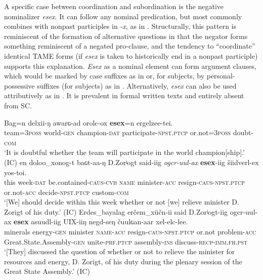 \documentclass[output=paper,colorlinks,citecolor=brown,chinesefont]{langscibook}
\begin{document}
A specific case between coordination and subordination is the negative nominalizer \textit{esex}. It can follow any nominal predication, but most commonly combines with nonpast participles in \textit{-x}, as in . Structurally, this pattern is reminiscent of the formation of alternative questions in that the negator forms something reminiscent of a negated pro-clause, and the tendency to “coordinate” identical TAME forms (if \textit{esex} is taken to historically end in a nonpast participle) supports this explanation. \textit{Esex} as a nominal element can form argument clauses, which would be marked by case suffixes as in  or, for subjects, by personal-possessive suffixes (for subjects) as in . Alternatively, \textit{esex} can also be used attributively as in . It is prevalent in formal written texts and entirely absent from SC. 

\ea\label{ex:kha:80}
    \gll Bag=n delxii-ŋ   awarɢ{}-ad orolc-ox \textbf{esex}=n ergelzee-tei. \\ 
         team=\textsc{3poss} world-\textsc{gen} champion-\textsc{dat}   participate-\textsc{npst.ptcp} or.not=\textsc{3poss} doubt-\textsc{com} \\
    \glt ‘It is doubtful whether the team will participate in the world champion[ship].’ (IC)
\z 
\ea\label{ex:kha:81}
    \gll en doloo\_xonog-t baɢt-aa-ŋ D.Zorʲogt said-iig \textit{ogcr-uul-ax} \textbf{esex}-iig šiidverl-ex yos-toi.\\ 
          this week-\textsc{dat} be.contained-\textsc{caus-cvb} \textsc{name} minister-\textsc{acc} resign-\textsc{caus-npst.ptcp} or.not-\textsc{acc} decide-\textsc{npst.ptcp} custom-\textsc{com} \\
    \glt  ‘[We] should decide within this week whether or not [we] relieve minister D. Zorigt of his duty.’ (IC)
\z 
\ea\label{ex:kha:82}
    \gll Erdes\_bayalag erčem\_xüčn-ii said D.Zorʲogt-iig ogcr-uul-ax \textbf{esex} asuudl-iig UIX-iiŋ negd-seŋ čuulɢan-aar xel-elc-lee.\\ 
          minerals energy-\textsc{gen} minister \textsc{name-acc}  resign-\textsc{caus-npst.ptcp} or.not problem-\textsc{acc} Great.State.Assembly\textsc{{}-gen} unite-\textsc{prf.ptcp} assembly-\textsc{ins} discuss\textsc{-recp-imm.fh.pst} \\
    \glt ‘[They] discussed the question of whether or not to relieve the minister for resources and energy, D. Zorigt, of his duty during the plenary session of the Great State Assembly.’ (IC)
\z 
\end{document}
